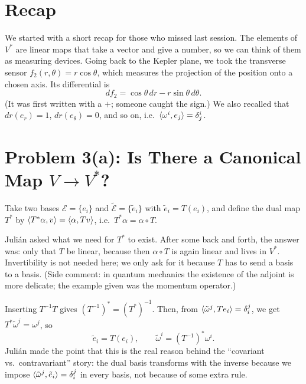 \documentclass[11pt,a4paper]{article}
\newcommand{\E}{\mathcal{E}}
\newcommand{\Et}{\widetilde{\mathcal{E}}}
\begin{document}
\makeseminarheader

\section{Recap}
\label{sec:recap}

We started with a short recap for those who missed last session. The elements of $V^*$ are linear maps that take a vector and give a number, so we can think of them as measuring devices. Going back to the Kepler plane, we took the transverse sensor $f_2(r,\theta)=r\cos\theta$, which measures the projection of the position onto a chosen axis. Its differential is
\[
  df_2=\cos\theta\,dr-r\sin\theta\,d\theta .
\]
(It was first written with a $+$; someone caught the sign.) We also recalled that $dr(e_r)=1$, $dr(e_\theta)=0$, and so on, i.e.\ $\langle \omega^i, e_j \rangle=\delta^i_j$.

\section{Problem 3(a): Is There a Canonical Map \texorpdfstring{$V\to V^*$}{V -> V*}?}
\label{sec:problem3a}

Take two bases $\E=\{e_i\}$ and $\Et=\{\tilde e_i\}$ with $\tilde e_i=T(e_i)$, and define the dual map $T^*$ by $\langle T^*\alpha, v \rangle=\langle \alpha, Tv \rangle$, i.e.\ $T^*\alpha=\alpha\circ T$.

Juli\'an asked what we need for $T^*$ to exist. After some back and forth, the answer was: only that $T$ be linear, because then $\alpha\circ T$ is again linear and lives in $V^*$. Invertibility is not needed here; we only ask for it because $T$ has to send a basis to a basis. (Side comment: in quantum mechanics the existence of the adjoint is more delicate; the example given was the momentum operator.)

Inserting $T^{-1}T$ gives $(T^{-1})^*=(T^*)^{-1}$. Then, from $\langle \tilde\omega^j, T e_i \rangle=\delta^j_i$, we get $T^*\tilde\omega^j=\omega^j$, so
\[
  \tilde e_i=T(e_i),\qquad \tilde\omega^i=(T^{-1})^*\omega^i .
\]
Juli\'an made the point that this is the real reason behind the ``covariant vs.\ contravariant'' story: the dual basis transforms with the inverse because we impose $\langle \tilde\omega^j, \tilde e_i \rangle=\delta^j_i$ in every basis, not because of some extra rule.
\end{document}
